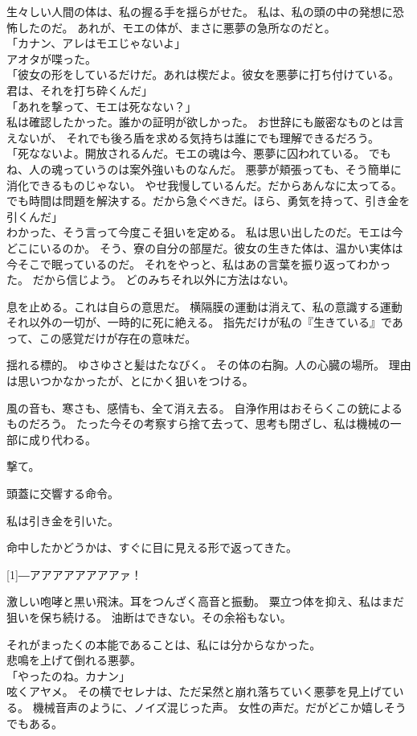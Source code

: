 \documentclass[../IHMain]{subfiles}
\begin{document}
生々しい人間の体は、私の握る手を揺らがせた。
私は、私の頭の中の発想に恐怖したのだ。
あれが、モエの体が、まさに悪夢の急所なのだと。\\
「カナン、アレはモエじゃないよ」\\
アオタが喋った。\\
「彼女の形をしているだけだ。あれは楔だよ。彼女を悪夢に打ち付けている。
君は、それを打ち砕くんだ」\\
「あれを撃って、モエは死なない？」\\
私は確認したかった。誰かの証明が欲しかった。
お世辞にも厳密なものとは言えないが、
それでも後ろ盾を求める気持ちは誰にでも理解できるだろう。\\
「死なないよ。開放されるんだ。モエの魂は今、悪夢に囚われている。
でもね、人の魂っていうのは案外強いものなんだ。
悪夢が頬張っても、そう簡単に消化できるものじゃない。
やせ我慢しているんだ。だからあんなに太ってる。
でも時間は問題を解決する。だから急ぐべきだ。ほら、勇気を持って、引き金を引くんだ」\\
わかった、そう言って今度こそ狙いを定める。
私は思い出したのだ。モエは今どこにいるのか。
そう、寮の自分の部屋だ。彼女の生きた体は、温かい実体は今そこで眠っているのだ。
それをやっと、私はあの言葉を振り返ってわかった。
だから信じよう。
どのみちそれ以外に方法はない。

息を止める。これは自らの意思だ。
横隔膜の運動は消えて、私の意識する運動それ以外の一切が、一時的に死に絶える。
指先だけが私の『生きている』であって、この感覚だけが存在の意味だ。

揺れる標的。
ゆさゆさと髪はたなびく。
その体の右胸。人の心臓の場所。
理由は思いつかなかったが、とにかく狙いをつける。

風の音も、寒さも、感情も、全て消え去る。
自浄作用はおそらくこの銃によるものだろう。
たった今その考察すら捨て去って、思考も閉ざし、私は機械の一部に成り代わる。

撃て。

頭蓋に交響する命令。

私は引き金を引いた。

命中したかどうかは、すぐに目に見える形で返ってきた。

\scalebox{3}[1]{―}アアアアアアアアァ！

激しい咆哮と黒い飛沫。耳をつんざく高音と振動。
粟立つ体を抑え、私はまだ狙いを保ち続ける。
油断はできない。その余裕もない。

それがまったくの本能であることは、私には分からなかった。\\

悲鳴を上げて倒れる悪夢。\\
「やったのね。カナン」\\
呟くアヤメ。
その横でセレナは、ただ呆然と崩れ落ちていく悪夢を見上げている。
機械音声のように、ノイズ混じった声。
女性の声だ。だがどこか嬉しそうでもある。
\end{document}

